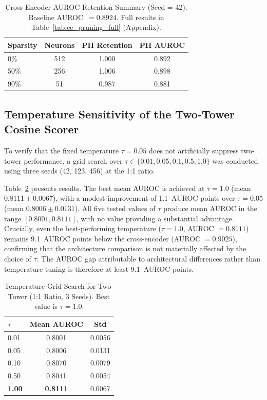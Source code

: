 \documentclass[journal]{IEEEtran}
\begin{document}
\begin{table}[!t]
  \caption{Cross-Encoder AUROC Retention Summary (Seed = 42).
    Baseline AUROC~$= 0.8924$. Full results in
    Table~\ref{tab:ce_pruning_full} (Appendix).}
  \label{tab:ce_pruning}
  \centering
  \footnotesize
  \begin{tabular}{@{}lccc@{}}
    \hline
    Sparsity & Neurons & PH Retention & PH AUROC \\
    \hline
    0\%  & 512 & 1.000 & 0.892 \\
    50\% & 256 & 1.006 & 0.898 \\
    90\% & 51  & 0.987 & 0.881 \\
    \hline
  \end{tabular}
\end{table}

\subsection{Temperature Sensitivity of the Two-Tower Cosine Scorer}
\label{ssec:tempsearch}

To verify that the fixed temperature $\tau = 0.05$ does not artificially
suppress two-tower performance, a grid search over
$\tau \in \{0.01, 0.05, 0.1, 0.5, 1.0\}$ was conducted using three seeds
(42, 123, 456) at the 1:1 ratio.

Table~\ref{tab:tempsearch} presents results. The best mean AUROC is achieved
at $\tau = 1.0$ (mean $0.8111 \pm 0.0067$), with a modest improvement of
1.1~AUROC points over $\tau = 0.05$ (mean $0.8006 \pm 0.0131$). All five
tested values of $\tau$ produce mean AUROC in the range $[0.8001, 0.8111]$,
with no value providing a substantial advantage. Crucially, even the
best-performing temperature ($\tau = 1.0$, AUROC $= 0.8111$) remains
9.1~AUROC points below the cross-encoder (AUROC $= 0.9025$), confirming
that the architecture comparison is not materially affected by the choice of
$\tau$. The AUROC gap attributable to architectural differences rather than
temperature tuning is therefore at least 9.1~AUROC points.

\begin{table}[!t]
  \caption{Temperature Grid Search for Two-Tower (1:1 Ratio, 3 Seeds).
    Best value is $\tau=1.0$.}
  \label{tab:tempsearch}
  \centering
  \small
  \begin{tabular}{lcc}
    \hline
    $\tau$ & Mean AUROC & Std \\
    \hline
    0.01 & 0.8001 & 0.0056 \\
    0.05 & 0.8006 & 0.0131 \\
    0.10 & 0.8070 & 0.0079 \\
    0.50 & 0.8041 & 0.0054 \\
    \textbf{1.00} & \textbf{0.8111} & 0.0067 \\
    \hline
  \end{tabular}
\end{table}
\end{document}
